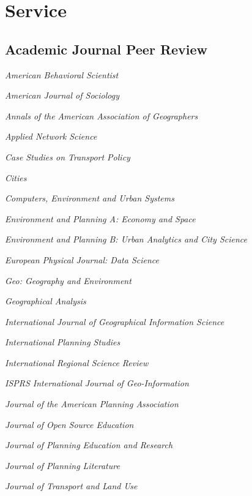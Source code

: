 \documentclass[12pt,letterpaper]{report}
\newcommand{\listitemspace}{0.25em}
\renewenvironment{itemize}
{\begin{list}{}{\setlength{\leftmargin}{0em}
            \setlength{\parskip}{0em}
            \setlength{\itemsep}{\listitemspace}
            \setlength{\parsep}{\listitemspace}}}
{\end{list}}
\begin{document}
    \section*{Service}

    \subsection*{Academic Journal Peer Review}

    \begin{itemize}

        \item \textit{American Behavioral Scientist}
        \item \textit{American Journal of Sociology}
        \item \textit{Annals of the American Association of Geographers}
        \item \textit{Applied Network Science}
        \item \textit{Case Studies on Transport Policy}
        \item \textit{Cities}
        \item \textit{Computers, Environment and Urban Systems}
        \item \textit{Environment and Planning A: Economy and Space}
        \item \textit{Environment and Planning B: Urban Analytics and City Science}
        \item \textit{European Physical Journal: Data Science}
        \item \textit{Geo: Geography and Environment}
        \item \textit{Geographical Analysis}
        \item \textit{International Journal of Geographical Information Science}
        \item \textit{International Planning Studies}
        \item \textit{International Regional Science Review}
        \item \textit{ISPRS International Journal of Geo-Information}
        \item \textit{Journal of the American Planning Association}
        \item \textit{Journal of Open Source Education}
        \item \textit{Journal of Planning Education and Research}
        \item \textit{Journal of Planning Literature}
        \item \textit{Journal of Transport and Land Use}

\end{itemize}
\end{document}
